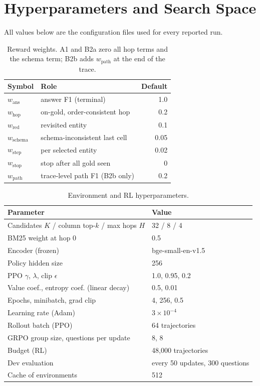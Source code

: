 \section{Hyperparameters and Search Space}
\label{app:hp}

All values below are the configuration files used for every reported run.

\begin{table}[h]
\centering\small
\begin{tabular}{@{}llr@{}}
\toprule
Symbol & Role & Default \\
\midrule
$w_{\text{ans}}$ & answer F1 (terminal) & 1.0 \\
$w_{\text{hop}}$ & on-gold, order-consistent hop & 0.2 \\
$w_{\text{red}}$ & revisited entity & 0.1 \\
$w_{\text{schema}}$ & schema-inconsistent last cell & 0.05 \\
$w_{\text{step}}$ & per selected entity & 0.02 \\
$w_{\text{stop}}$ & stop after all gold seen & 0 \\
$w_{\text{path}}$ & trace-level path F1 (B2b only) & 0.2 \\
\bottomrule
\end{tabular}
\caption{Reward weights. A1 and B2a zero all hop terms and the schema term; B2b adds $w_{\text{path}}$ at the end of the trace.}
\label{tab:reward-weights}
\end{table}

\begin{table}[h]
\centering\small
\begin{tabular}{@{}p{}p{}@{}}
\toprule
Parameter & Value \\
\midrule
Candidates $K$ / column top-$k$ / max hops $H$ & 32 / 8 / 4 \\
BM25 weight at hop 0 & 0.5 \\
Encoder (frozen) & bge-small-en-v1.5 \\
Policy hidden size & 256 \\
PPO $\gamma$, $\lambda$, clip $\epsilon$ & 1.0, 0.95, 0.2 \\
Value coef., entropy coef. (linear decay) & 0.5, 0.01 \\
Epochs, minibatch, grad clip & 4, 256, 0.5 \\
Learning rate (Adam) & $3\times10^{-4}$ \\
Rollout batch (PPO) & 64 trajectories \\
GRPO group size, questions per update & 8, 8 \\
Budget (RL) & 48{,}000 trajectories \\
Dev evaluation & every 50 updates, 300 questions \\
Cache of environments & 512 \\
\bottomrule
\end{tabular}
\caption{Environment and RL hyperparameters.}
\label{tab:rl-hp}
\end{table}

